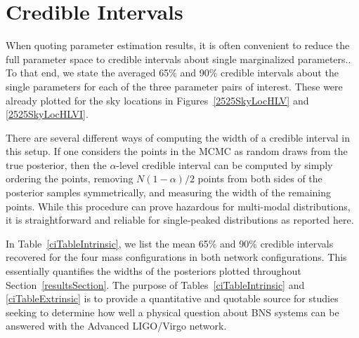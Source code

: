 \documentclass[11pt,a4paper]{emulateapj} 
\newcommand{\carl}[1]{{\color{red} #1}}
\begin{document}

\section{Credible Intervals}
\label{ciSection}

When quoting parameter estimation results, it is often convenient to
reduce the full parameter space to credible intervals about single
marginalized parameters..  To that end, we state the averaged 65\% and 90\% credible
intervals about the single parameters for each of the three
parameter pairs of interest.  These were already plotted for the sky
locations in Figures~\ref{2525SkyLocHLV} and \ref{2525SkyLocHLVI}.

There are several different ways of computing the width of a credible
interval in this setup.  If one considers the points in the MCMC as
random draws from the true posterior, then the $\alpha$-level credible
interval can be computed by simply ordering the points, removing
$N(1-\alpha )/2$ points from both sides of the posterior samples
symmetrically, and measuring the width of the remaining points.  While
this procedure can prove hazardous for multi-modal distributions, it
is straightforward and reliable for single-peaked distributions as
reported here.

In Table~\ref{ciTableIntrinsic}, we list the mean 65\% and 90\% credible
intervals recovered for the four mass configurations in both network
configurations. This essentially quantifies the widths of the
posteriors plotted throughout Section~\ref{resultsSection}.  The
purpose of Tables~\ref{ciTableIntrinsic} and \ref{ciTableExtrinsic} is
to provide a quantitative and quotable source for studies seeking to
determine how well a physical question about BNS systems can be
answered with the Advanced LIGO/Virgo network.
\end{document}
